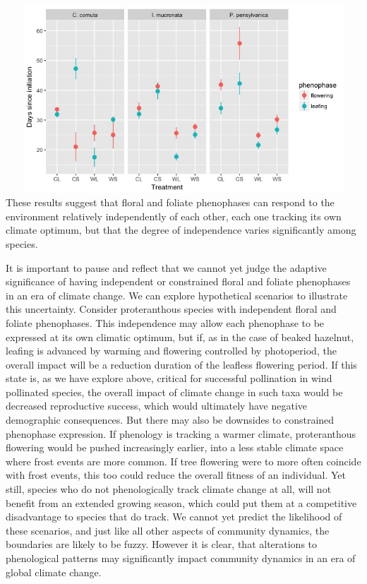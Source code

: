 \documentclass{article}\usepackage[]{graphicx}\usepackage[]{color}
\begin{document}
\includegraphics[width=16cm,height=7cm] {shrubs_4_csee}
These results suggest that floral and foliate phenophases can respond to the environment relatively independently of each other, each one tracking its own climate optimum, but that the degree of independence varies significantly among species. 
\par It is important to pause and reflect that we cannot yet judge the adaptive significance of having independent or constrained floral and foliate phenophases in an era of climate change. We can explore hypothetical scenarios to illustrate this uncertainty. Consider proteranthous species with independent floral and foliate phenophases. This independence may allow each phenophase to be expressed at its own climatic optimum, but if, as in the case of beaked hazelnut, leafing is advanced by warming and flowering controlled by photoperiod, the overall impact will be a reduction duration of the leafless flowering period. If this state is, as we have explore above, critical for successful pollination in wind pollinated species, the overall impact of climate change in such taxa would be decreased reproductive success, which would ultimately have negative demographic consequences. But there may also be downsides to constrained phenophase expression. If phenology is tracking a warmer climate, proteranthous flowering would be pushed increasingly earlier, into a less stable climate space where frost events are more common. If tree flowering were to more often coincide with frost events, this too could reduce the overall fitness of an individual. Yet still, species who do not phenologically track climate change at all, will not benefit from an extended growing season, which could put them at a competitive disadvantage to species that do track. We cannot yet predict the likelihood of these scenarios, and just like all other aspects of community dynamics, the boundaries are likely to be fuzzy. However it is clear, that alterations to phenological patterns may significantly impact community dynamics in an era of global climate change.




\end{document}
